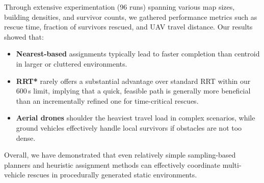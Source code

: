 \documentclass[12pt,a4paper]{report}
\begin{document}
Through extensive experimentation (96 runs) spanning various map sizes, building densities,
and survivor counts, we gathered performance metrics such as rescue time, fraction of
survivors rescued, and UAV travel distance. Our results showed that:
\begin{itemize}
    \item \textbf{Nearest-based} assignments typically lead to faster completion than
          centroid in larger or cluttered environments.
    \item \textbf{RRT*} rarely offers a substantial advantage over standard RRT within
          our 600\,s limit, implying that a quick, feasible path is generally more
          beneficial than an incrementally refined one for time-critical rescues.
    \item \textbf{Aerial drones} shoulder the heaviest travel load in complex scenarios,
          while ground vehicles effectively handle local survivors if obstacles are not
          too dense.
\end{itemize}
Overall, we have demonstrated that even relatively simple sampling-based planners and
heuristic assignment methods can effectively coordinate multi-vehicle rescues in
procedurally generated static environments.
\end{document}

